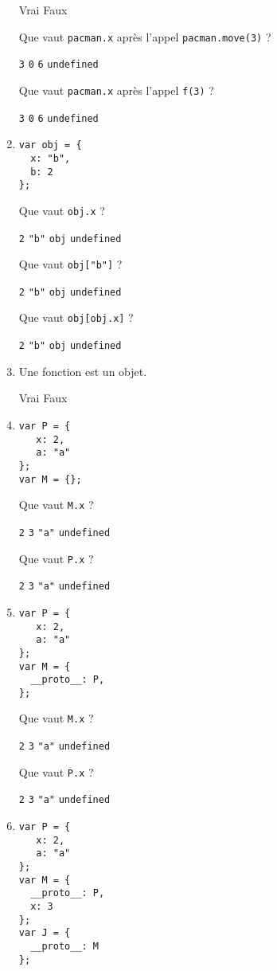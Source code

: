 \documentclass[a4paper, 12pt]{article}
\newcommand{\fullpoint}[1]{\textcolor{RubineRed}{#1}}
\newcommand{\choice}[1]{\Square\hspace{2pt} #1\hspace{5pt}}
\newcommand{\choicec}[1]{\Square\hspace{2pt} \lstinline{#1}\hspace{5pt}}
\newcommand{\choiceg}[1]{\fullpoint{\XBox\hspace{2pt} #1\hspace{5pt}}}
\newcommand{\choicecg}[1]{\fullpoint{\XBox\hspace{2pt} \lstinline{#1}\hspace{5pt}}}
\begin{document}
\begin{enumerate}
  \choice{Vrai} \choiceg{Faux}

  Que vaut \lstinline{pacman.x} après l'appel
  \lstinline{pacman.move(3)} ?

  \choicecg{3} \choicec{0} \choicec{6} \choicec{undefined}

  Que vaut \lstinline{pacman.x} après l'appel \lstinline{f(3)} ?

  \choicecg{3} \choicec{0} \choicec{6} \choicec{undefined}
\item \lstset{language=javascript}
\begin{lstlisting}
var obj = {
  x: "b",
  b: 2
};
\end{lstlisting}

  Que vaut \lstinline{obj.x} ?

  \choicec{2} \choicecg{"b"} \choicec{obj} \choicec{undefined}

  Que vaut \lstinline{obj["b"]} ?

  \choicecg{2} \choicec{"b"} \choicec{obj} \choicec{undefined}

  Que vaut \lstinline{obj[obj.x]} ?

  \choicecg{2} \choicec{"b"} \choicec{obj} \choicec{undefined}
\item Une fonction est un objet.

   \choiceg{Vrai} \choice{Faux}
\item \lstset{language=javascript}
\begin{lstlisting}
var P = {
   x: 2,
   a: "a"
};
var M = {};
\end{lstlisting}

  Que vaut \lstinline{M.x} ?

  \choicec{2} \choicec{3} \choicec{"a"} \choicecg{undefined}

  Que vaut \lstinline{P.x} ?

  \choicecg{2} \choicec{3} \choicec{"a"} \choicec{undefined}
\item \lstset{language=javascript}
\begin{lstlisting}
var P = {
   x: 2,
   a: "a"
};
var M = {
  __proto__: P,
};
\end{lstlisting}

  Que vaut \lstinline{M.x} ?

  \choicecg{2} \choicec{3} \choicec{"a"} \choicec{undefined}

  Que vaut \lstinline{P.x} ?

  \choicecg{2} \choicec{3} \choicec{"a"} \choicec{undefined}
\item \lstset{language=javascript}
\begin{lstlisting}
var P = {
   x: 2,
   a: "a"
};
var M = {
  __proto__: P,
  x: 3
};
var J = {
  __proto__: M
};
\end{lstlisting}


\end{enumerate}
\end{document}
